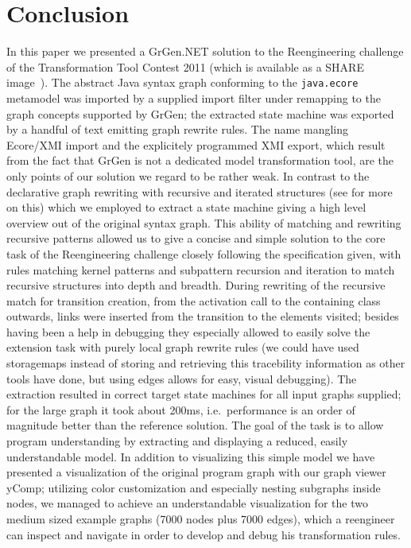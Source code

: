 \documentclass[copyright]{eptcs}
\begin{document}
\section{Conclusion}
In this paper we presented a GrGen.NET solution to the Reengineering challenge of the Transformation Tool Contest 2011 (which is available as a SHARE image~\cite{share}).
The abstract Java syntax graph conforming to the \texttt{java.ecore} metamodel was imported by a supplied import filter under remapping to the graph concepts supported by GrGen; the extracted state machine was exported by a handful of text emitting graph rewrite rules.
The name mangling Ecore/XMI import and the explicitely programmed XMI export, which result from the fact that GrGen is not a dedicated model transformation tool, are the only points of our solution we regard to be rather weak.
In contrast to the declarative graph rewriting with recursive and iterated structures (see \cite{StructuralRecursion} for more on this) which we employed to extract a state machine giving a high level overview out of the original syntax graph.
This ability of matching and rewriting recursive patterns allowed us to give a concise and simple solution to the core task of the Reengineering challenge closely following the specification given,
with rules matching kernel patterns and subpattern recursion and iteration to match recursive structures into depth and breadth.
During rewriting of the recursive match for transition creation, from the activation call to the containing class outwards, links were inserted from the transition to the elements visited;
besides having been a help in debugging they especially allowed to easily solve the extension task with purely local graph rewrite rules (we could have used storagemaps instead of storing and retrieving this tracebility information as other tools have done, but using edges allows for easy, visual debugging).
The extraction resulted in correct target state machines for all input graphs supplied;
for the large graph it took about 200ms, i.e.\ performance is an order of magnitude better than the reference solution.
The goal of the task is to allow program understanding by extracting and displaying a reduced, easily understandable model.
In addition to visualizing this simple model we have presented a visualization of the original program graph with our graph viewer yComp; utilizing color customization and especially nesting subgraphs inside nodes, we managed to achieve an understandable visualization for the two medium sized example graphs (7000 nodes plus 7000 edges), which a reengineer can inspect and navigate in order to develop and debug his transformation rules.
\end{document}
